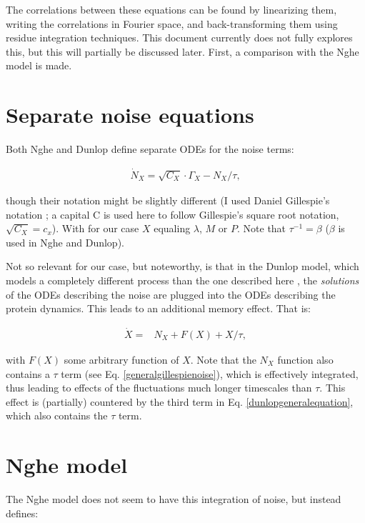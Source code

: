 \documentclass[a4paper,twoside,10pt]{report}
\begin{document}
The correlations between these equations can be found by linearizing them, writing the correlations in Fourier space, and back-transforming them using residue integration techniques. 
This document currently does not fully explores this, but this will partially be discussed later.
First, a comparison with the Nghe model is made.

\section{Separate noise equations}

Both Nghe and Dunlop define separate ODEs for the noise terms:

\begin{align}
\label{generalgillespienoise}
\dot{N}_X = \sqrt{C_X} \cdot \Gamma_X - N_X/\tau
,
\end{align}

though their notation might be slightly different (I used Daniel Gillespie's notation \cite{Gillespie1996}; a capital C is used here to follow Gillespie's square root notation, $\sqrt{C_X}=c_x$).
With for our case $X$ equaling $\lambda$, $M$ or $P$. Note that $\tau^{-1}=\beta$ ($\beta$ is used in Nghe and Dunlop).

Not so relevant for our case, but noteworthy, is that in the Dunlop model, which models a completely different process than the one described here \cite{Dunlop2008}, the \textit{solutions} of the ODEs describing the noise are plugged into the ODEs describing the protein dynamics. This leads to an additional memory effect.
%
That is:

\begin{align}
\label{dunlopgeneralequation}
\dot{X} = & N_X  + F(X) + X/\tau
,
\end{align}

with $F(X)$ some arbitrary function of $X$. 
Note that the $N_X$ function also contains a $\tau$ term (see Eq. \ref{generalgillespienoise}), which is effectively integrated, thus leading to effects of the fluctuations much longer timescales than $\tau$. 
This effect is (partially) countered by the third term in Eq. \ref{dunlopgeneralequation}, which also contains the $\tau$ term.

\section{Nghe model}

The Nghe model does not seem to have this integration of noise, but instead defines:
\end{document}
